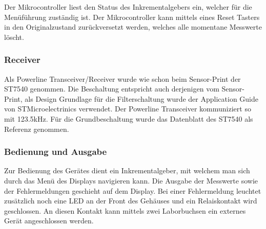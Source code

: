 Der Mikrocontroller liest den Status des Inkrementalgebers ein, welcher für die Menüführung zuständig ist. Der Mikrocontroller kann mittels eines Reset Tasters in den Originalzustand zurückversetzt werden, welches alle momentane Messwerte löscht.

\subsubsection{Receiver}
Als Powerline Transceiver/Receiver wurde wie schon beim Sensor-Print der ST7540 genommen. Die Beschaltung entspricht auch derjenigen vom Sensor-Print, als Design Grundlage für die Filterschaltung wurde der Application Guide \cite[p. 48]{Applic_Guide_ST7540} von STMicroelectrinics verwendet. Der Powerline Transceiver kommuniziert so mit 123.5kHz. Für die Grundbeschaltung wurde das Datenblatt des ST7540 \cite[p. 40]{Datasheet_ST7540} als Referenz genommen.

\subsubsection{Bedienung und Ausgabe}
Zur Bedienung des Gerätes dient ein Inkrementalgeber, mit welchem man sich durch das Menü des Displays navigieren kann. Die Ausgabe der Messwerte sowie der Fehlermeldungen geschieht auf dem Display. Bei einer Fehlermeldung leuchtet zusätzlich noch eine LED an der Front des Gehäuses und ein Relaiskontakt wird geschlossen. An diesen Kontakt kann mittels zwei Laborbuchsen ein externes Gerät angeschlossen werden.

